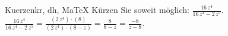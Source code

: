 \begin{MAufgabe}{Kuerzen}{kr, dh, MaTeX}
K\"urzen Sie soweit m\"oglich: $\frac{16\, z^4}{16\, z^4 - 2\, z^5}$.\\ 
\ifLsg\MLoesung
\quad $\frac{16\, z^4}{16\, z^4 - 2\, z^5}=\frac{(2\, z^4)\cdot(8)}{(2\, z^4)\cdot(8 - z)}=\frac{8}{8 - z}=\frac{-8}{z - 8}$.\else\relax\fi
 \end{MAufgabe}